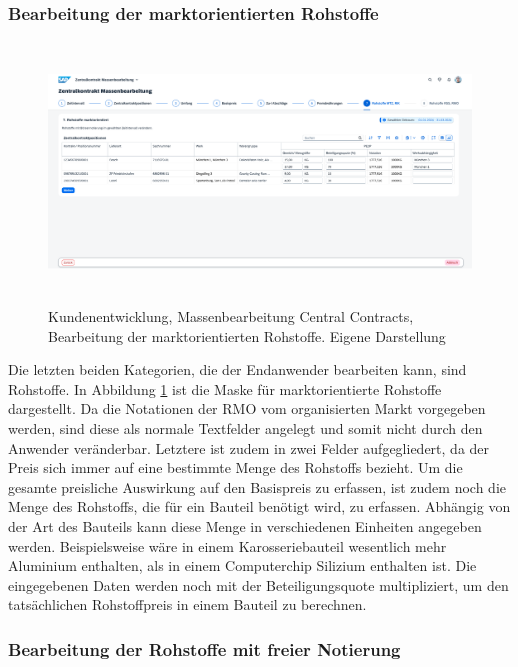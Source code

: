\subsubsection{Bearbeitung der marktorientierten Rohstoffe}

\begin{figure}[H]
    \centering
    \includegraphics[height=6.91cm]{Bilder/Praxisteil-KL-Schritt-7.png}
    \caption[Kundenentwicklung, Massenbearbeitung Central Contracts, Bearbeitung der marktorientierten Rohstoffe]{Kundenentwicklung, Massenbearbeitung Central Contracts, Bearbeitung der marktorientierten Rohstoffe. Eigene Darstellung}
    \label{fig:PraxisKLSchritt7}
\end{figure}

Die letzten beiden Kategorien, die der Endanwender bearbeiten kann, sind Rohstoffe. In Abbildung \ref{fig:PraxisKLSchritt7} ist die Maske für marktorientierte Rohstoffe dargestellt. Da die Notationen der RMO vom organisierten Markt vorgegeben werden, sind diese als normale Textfelder angelegt und somit nicht durch den Anwender veränderbar. Letztere ist zudem in zwei Felder aufgegliedert, da der Preis sich immer auf eine bestimmte Menge des Rohstoffs bezieht. Um die gesamte preisliche Auswirkung auf den Basispreis zu erfassen, ist zudem noch die Menge des Rohstoffs, die für ein Bauteil benötigt wird, zu erfassen. Abhängig von der Art des Bauteils kann diese Menge in verschiedenen Einheiten angegeben werden. Beispielsweise wäre in einem Karosseriebauteil wesentlich mehr Aluminium enthalten, als in einem Computerchip Silizium enthalten ist. Die eingegebenen Daten werden noch mit der Beteiligungsquote multipliziert, um den tatsächlichen Rohstoffpreis in einem Bauteil zu berechnen.

\subsubsection{Bearbeitung der Rohstoffe mit freier Notierung}

